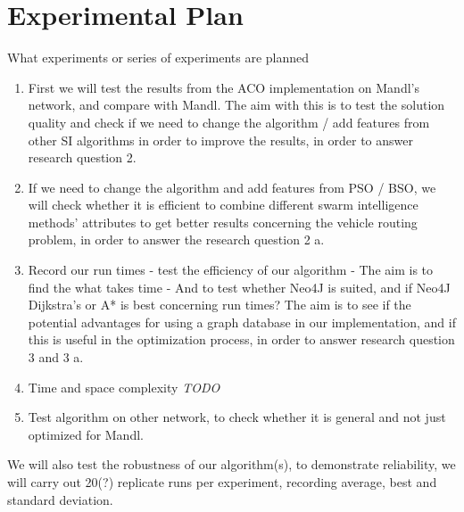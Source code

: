 \section{Experimental Plan}



What experiments or series of experiments are planned

\begin{enumerate}
\item First we will test the results from the ACO implementation on Mandl's network, and compare with Mandl. 
The aim with this is to test the solution quality and check if we need to change the algorithm / add features from other SI algorithms in order to improve the results, in order to answer research question 2.

\item If we need to change the algorithm and add features from PSO / BSO, we will check whether it is efficient to combine different swarm intelligence methods' attributes to get better results concerning the vehicle routing problem, in order to answer the research question 2 a.

\item Record our run times - test the efficiency of our algorithm - The aim is to find the what takes time - And to test whether Neo4J is suited, and if Neo4J Dijkstra's or A* is best concerning run times? The aim is to see if the potential advantages for using a graph database in our implementation, and if this is useful in the optimization process, in order to answer research question 3 and 3 a.

\item Time and space complexity \emph{\color{red} TODO}

\item Test algorithm on other network, to check whether it is general and not just optimized for Mandl.

\end{enumerate}

We will also test the robustness of our algorithm(s), to demonstrate reliability, we will carry out 20(?) replicate runs per experiment, recording average, best and standard deviation. 


